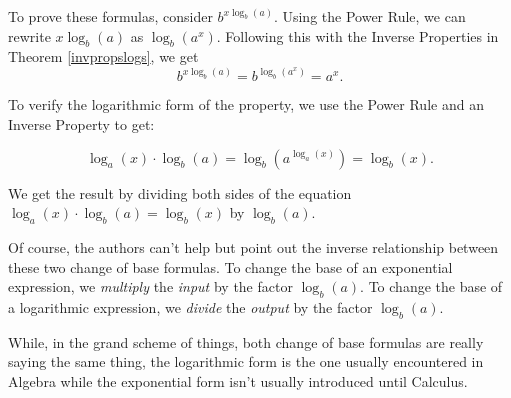 To prove these formulas, consider $b^{x \log_{b}(a)}$. Using the Power Rule, we can rewrite $x \log_{b}(a)$ as $\log_{b}\left(a^{x}\right)$.  Following this with the Inverse Properties in Theorem \ref{invpropslogs}, we get \[ b^{x \log_{b}(a)} = b^{\log_{b}\left(a^{x}\right)} = a^{x}.\] 

 To verify the logarithmic form of the property, we use the Power Rule and an Inverse Property to get: 
 
  \[\log_{a}(x) \cdot \log_{b}(a) =  \log_{b} \left(a^{\log_{a}(x)}\right) = \log_{b}(x).\] 
  
 We get the result by dividing both sides of the equation $\log_{a}(x) \cdot \log_{b}(a)  =  \log_{b}(x)$ by  $\log_{b}(a)$.  
 
 \smallskip
 
 
 Of course, the authors can't help but point out the inverse relationship between these two change of base formulas.  To change the base of an exponential expression, we \textit{multiply} the \textit{input} by the factor $\log_{b}(a)$.  To change the base of a logarithmic expression, we \textit{divide} the \textit{output} by the factor $\log_{b}(a)$.  
 
 \smallskip
 
 
 While, in the grand scheme of things, both change of base formulas are really saying the same thing, the logarithmic form is the one usually encountered in Algebra while the exponential form isn't usually introduced until Calculus.

\smallskip

